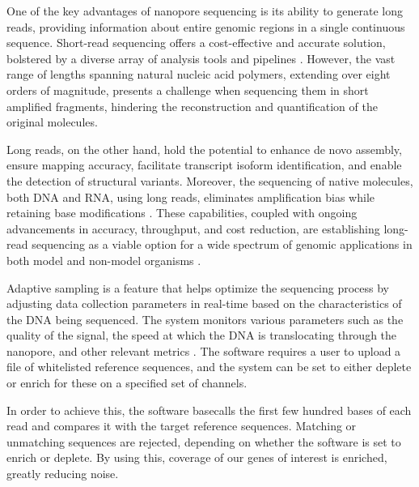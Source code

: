 One of the key advantages of nanopore sequencing is its ability to generate long reads, providing information about entire genomic regions in a single continuous sequence. Short-read sequencing offers a cost-effective and accurate solution, bolstered by a diverse array of analysis tools and pipelines \citep{short_reads}. However, the vast range of lengths spanning natural nucleic acid polymers, extending over eight orders of magnitude, presents a challenge when sequencing them in short amplified fragments, hindering the reconstruction and quantification of the original molecules. 

Long reads, on the other hand, hold the potential to enhance de novo assembly, ensure mapping accuracy, facilitate transcript isoform identification, and enable the detection of structural variants. Moreover, the sequencing of native molecules, both DNA and RNA, using long reads, eliminates amplification bias while retaining base modifications \citep{long_read_adv}. These capabilities, coupled with ongoing advancements in accuracy, throughput, and cost reduction, are establishing long-read sequencing as a viable option for a wide spectrum of genomic applications in both model and non-model organisms \citep{long_read_adv2}.

Adaptive sampling is a feature that helps optimize the sequencing process by adjusting data collection parameters in real-time based on the characteristics of the DNA being sequenced. The system monitors various parameters such as the quality of the signal, the speed at which the DNA is translocating through the nanopore, and other relevant metrics \citep{ont_as}. The software requires a user to upload a file of whitelisted reference sequences, and the system can be set to either deplete or enrich for these on a specified set of channels. 

In order to achieve this, the software basecalls the first few hundred bases of each read and compares it with the target reference sequences. Matching or unmatching sequences are rejected, depending on whether the software is set to enrich or deplete. By using this, coverage of our genes of interest is enriched, greatly reducing noise.